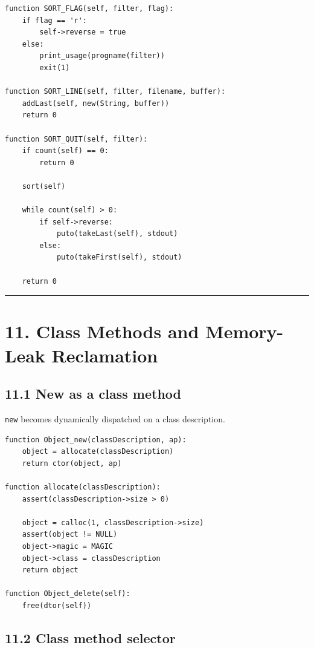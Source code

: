 \documentclass[11pt]{article}
\begin{document}
\begin{verbatim}
function SORT_FLAG(self, filter, flag):
    if flag == 'r':
        self->reverse = true
    else:
        print_usage(progname(filter))
        exit(1)

function SORT_LINE(self, filter, filename, buffer):
    addLast(self, new(String, buffer))
    return 0

function SORT_QUIT(self, filter):
    if count(self) == 0:
        return 0

    sort(self)

    while count(self) > 0:
        if self->reverse:
            puto(takeLast(self), stdout)
        else:
            puto(takeFirst(self), stdout)

    return 0
\end{verbatim}

\begin{center}\rule{0.5\linewidth}{0.5pt}\end{center}

\section{11. Class Methods and Memory-Leak
Reclamation}\label{class-methods-and-memory-leak-reclamation}

\subsection{11.1 New as a class method}\label{new-as-a-class-method}

\texttt{new} becomes dynamically dispatched on a class
description.

\begin{verbatim}
function Object_new(classDescription, ap):
    object = allocate(classDescription)
    return ctor(object, ap)

function allocate(classDescription):
    assert(classDescription->size > 0)

    object = calloc(1, classDescription->size)
    assert(object != NULL)
    object->magic = MAGIC
    object->class = classDescription
    return object

function Object_delete(self):
    free(dtor(self))
\end{verbatim}

\subsection{11.2 Class method selector}\label{class-method-selector}
\end{document}
